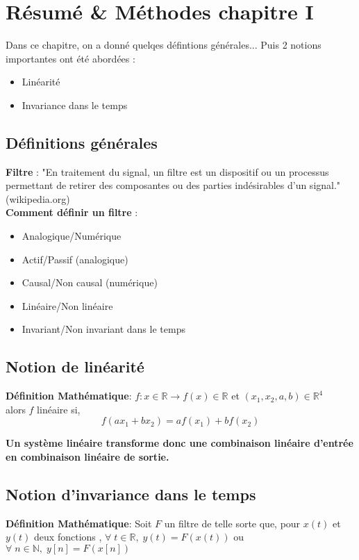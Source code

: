 \documentclass[11pt,a4paper]{article}
\begin{document}
\section*{Résumé \& Méthodes chapitre I}
Dans ce chapitre, on a donné quelqes défintions générales... Puis 2 notions importantes ont été abordées :
\begin{itemize}
\item  Linéarité 
\item Invariance dans le temps
\end{itemize} 

\subsection*{Définitions générales}
\textbf{Filtre} : "En traitement du signal, un filtre est un dispositif ou un processus permettant de retirer des composantes ou des parties indésirables d'un signal." (wikipedia.org)\\

\textbf{Comment définir un filtre} :
\begin{itemize}
\item Analogique/Numérique
\item Actif/Passif (analogique)
\item Causal/Non causal (numérique)
\item Linéaire/Non linéaire 
\item Invariant/Non invariant dans le temps
\end{itemize}

\subsection*{Notion de linéarité}
\textbf{Définition Mathématique}:  $f : x \in \mathbb{R} \rightarrow f(x) \in \mathbb{R} $ et $(x_1,x_2,a,b) \in \mathbb{R}^4$ \\ alors $f$ linéaire si, \\

\[f(a x_1 + b x_2) = a f(x_1) + b f(x_2)\]

\textbf{Un système linéaire transforme donc une combinaison linéaire d'entrée en combinaison linéaire de sortie.}\\

\subsection*{Notion d'invariance dans le temps}
\textbf{Définition Mathématique}:
Soit $F$ un filtre de telle sorte que, pour $x(t)$ et $y(t)$ deux fonctions , $ \forall \; t \in \mathbb{R}, \; y(t) = F(x(t))$ ou $ \forall \; n \in \mathbb{N}, \; y[n] = F(x[n])$ \\
\end{document}
